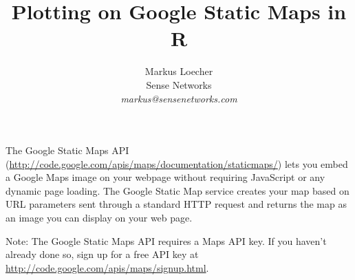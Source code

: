\documentclass{article}
\begin{document}

\title{Plotting on Google Static Maps in R}
\author{Markus Loecher\\  Sense Networks \\  \it{markus@sensenetworks.com}}

\maketitle
\noindent
The Google Static Maps API (\url{http://code.google.com/apis/maps/documentation/staticmaps/}) lets you embed a Google Maps image on your webpage without requiring JavaScript or any dynamic page loading. The Google Static Map service creates your map based on URL parameters sent through a standard HTTP request and returns the map as an image you can display on your web page.

\noindent Note: The Google Static Maps API requires a Maps API key. If you haven't already done so, sign up for a free API key at \url{http://code.google.com/apis/maps/signup.html}.
\end{document}
